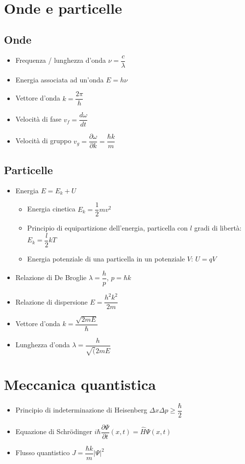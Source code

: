 \documentclass{article}
\begin{document}
\section{Onde e particelle}
\subsection{Onde}
\begin{itemize}
	\item Frequenza / lunghezza d'onda \( \nu = \dfrac{c}{\lambda} \)
	\item Energia associata ad un'onda \( E = h \nu \)
	\item Vettore d'onda \( k = \dfrac{2 \pi}{h} \)
	\item Velocità di fase \( v_f = \dfrac{d \omega}{d t}\)
		\item Velocità di gruppo \( v_g = \dfrac{\partial \omega}{\partial k} = \dfrac{\hbar k}{m} \)
\end{itemize}

\subsection{Particelle}
\begin{itemize}
	\item Energia \( E = E_k + U \)
	\begin{itemize}
		\item Energia cinetica \( E_k = \dfrac{1}{2} m v ^ 2 \)
		\item Principio di equipartizione dell'energia, particella con \( l \) gradi di libertà: \( E_k = \dfrac{l}{2} k T \)
		\item Energia potenziale di una particella in un potenziale \( V \): \( U = qV \)  
	\end{itemize}
	\item Relazione di De Broglie \( \lambda = \dfrac{h}{p} \), \( p = \hbar k \)
	\item Relazione di dispersione \( E = \dfrac{h ^ 2 k ^ 2}{2 m} \)
	\item Vettore d'onda \( k = \dfrac{\sqrt{2mE}}{\hbar} \)
	\item Lunghezza d'onda \( \lambda = \dfrac{h}{\sqrt(2mE} \)
\end{itemize}

\section{Meccanica quantistica}
\begin{itemize}
	\item Principio di indeterminazione di Heisenberg \( \Delta x \Delta p \geq \dfrac{\hbar}{2} \)
	\item Equazione di Schrödinger \( i \hbar \dfrac{\partial \Psi}{\partial t} (x, t) = \hat{H} \Psi (x,t) \)
	\item Flusso quantistico \( J = \dfrac{\hbar k}{m} \left| \Psi \right| ^ 2 \)
\end{itemize}
\end{document}
